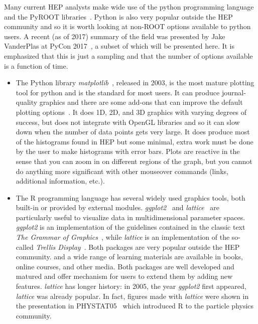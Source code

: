 \documentclass[12pt,a4paper]{article}
\begin{document}
Many current HEP analysts make wide use of the python programming language and the PyROOT libraries~\cite{PyROOT}.
Python is also very popular outside the HEP community and so it is worth looking at non-ROOT options available to python users.
A recent (as of 2017) summary of the field was presented by Jake VanderPlas at PyCon 2017~\cite{VanderPlas2017}, a subset
of which will be presented here. It is emphasized that this is just a sampling and that the number of options available
is a function of time.

\begin{itemize}
\item The Python library \textit{matplotlib}~\cite{Hunter2007}, released in 2003, is the most mature plotting tool for python and is the standard
for most users. It can produce journal-quality graphics and there are some add-ons that can improve the default plotting
options~\cite{seaborn}. It does 1D, 2D, and 3D graphics with varying degrees of success, but does not
integrate with OpenGL libraries and so it can slow down when the number of data points gets very large.
It does produce most of the histograms found in HEP but some minimal, extra work must be done by the user
to make histograms with error bars. Plots are reactive in the sense that you can zoom in on different regions of the graph,
but you cannot do anything more significant with other mouseover commands (links, additional information, etc.).

\item The R programming language has several widely used graphics tools, both built-in or provided by external modules.
\textit{ggplot2}~\cite{Wickham2009} and \textit{lattice}~\cite{Sarkar2008} are particularly useful to visualize data in multidimensional parameter spaces.
\textit{ggplot2} is an implementation of the guidelines contained in the classic text \textit{The Grammar of Graphics}~\cite{Wilkinson2005}, while \textit{lattice} is an implementation of the so-called \textit{Trellis Display}~\cite{Trellis}.
Both packages are very popular outside the HEP community. and a wide range of learning materials are available in books, online courses, and other media. Both packages are well developed and matured and offer mechanism for users to extend them by adding new features. 
\textit{lattice} has longer history: in 2005, the year \textit{ggplot2} first appeared, \textit{lattice} was already popular. In fact, figures made with \textit{lattice} were shown in the
presentation in PHYSTAT05~\cite{phystat05} which introduced R to the
particle physics community. 
\end{itemize}
\end{document}
